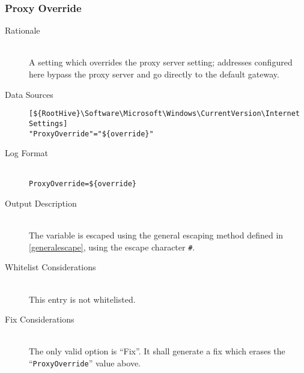 \subsubsection{Proxy Override}
\begin{description}
\item[Rationale] \hfill \\
A setting which overrides the proxy server setting; addresses configured here
bypass the proxy server and go directly to the default gateway.
\item[Data Sources] \hfill
\vspace{-\baselineskip}
\begin{verbatim}
[${RootHive}\Software\Microsoft\Windows\CurrentVersion\Internet Settings]
"ProxyOverride"="${override}"
\end{verbatim}
\item[Log Format] \hfill \\
\verb|ProxyOverride=${override}|
\item[Output Description] \hfill \\
The variable  is escaped using the general escaping method defined
in \ref{generalescape}, using the escape character \verb|#|.
\item[Whitelist Considerations] \hfill \\
This entry is not whitelisted.
\item[Fix Considerations] \hfill \\
The only valid option is ``Fix''. It shall generate a fix which erases the
``\verb|ProxyOverride|'' value above.
\end{description}

